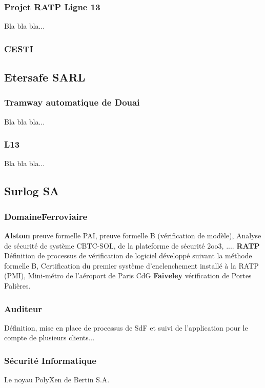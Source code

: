 \documentclass[a4paper,12pt]{article}
\begin{document}
\subsubsection{Projet RATP Ligne 13}
Bla bla bla...

\subsubsection{CESTI}



\subsection{Etersafe SARL}
\subsubsection{Tramway automatique de Douai}
Bla bla bla...

\subsubsection{L13}
Bla bla bla...


\subsection{Surlog SA}
\subsubsection{DomaineFerroviaire}
\textbf{Alstom} preuve formelle PAI, preuve formelle B (v\'erification
  de mod\`ele), Analyse de s\'ecurit\'e de syst\`eme CBTC-SOL, de la
  plateforme de s\'ecurit\'e 2oo3, .... 
\textbf{RATP} D\'efinition de processus de v\'erification de logiciel
  d\'evelopp\'e suivant la m\'ethode formelle B, Certification du
  premier syst\`eme d'enclenchement install\'e à la RATP (PMI),
  Mini-m\'etro de l'a\'eroport de Paris CdG 
\textbf{Faiveley} v\'erification de Portes Pali\`eres.  


\subsubsection {Auditeur}
D\'efinition, mise en place de processus de SdF et suivi de
l'application pour le compte de plusieurs clients... 

\subsubsection{S\'ecurit\'e Informatique}
Le noyau PolyXen de Bertin S.A.
\end{document}
